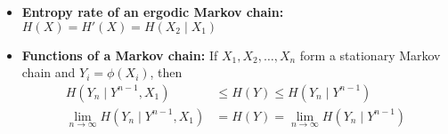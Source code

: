 \documentclass[frenchspacing,9pt,landscape,a4paper]{article}
\begin{document}
\begin{multicols}{4}
\begin{itemize}
    \item \textbf{Entropy rate of an ergodic Markov chain:} $H(X)=H'(X)=H(X_2\mid X_1)$ 
    \item \textbf{Functions of a Markov chain:} If  $X_1,X_2,\dots,X_n$ form a stationary Markov chain and
        $Y_i=\phi(X_i)$, then
        \begin{align*}
            H(Y_n\mid Y^{n-1},X_1)&\leq H(Y)\leq H(Y_n\mid Y^{n-1})\\
            \lim_{n\to\infty}H(Y_n\mid Y^{n-1},X_1)&=H(Y)=\lim_{n\to\infty}H(Y_n\mid Y^{n-1})\\
        \end{align*}
\end{itemize}
\end{multicols}
\end{document}
